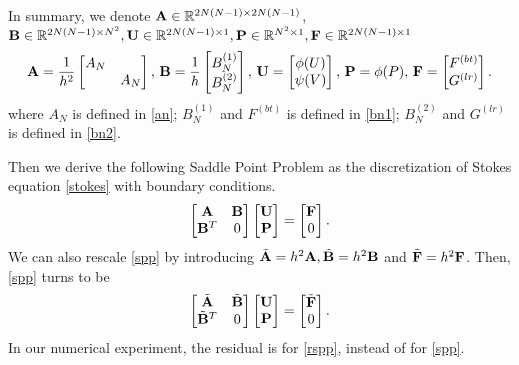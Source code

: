 \documentclass[english]{pkupaper}
\begin{document}
In summary, we denote $\mathbf{A}\in\mathbb{R}^{2N(N-1)\times2N(N-1)}$, $\mathbf{B}\in \mathbb{R}^{2N(N-1)\times N^2}, \mathbf{U} \in\mathbb{R}^{2N(N-1)\times1}, \mathbf{P}\in \mathbb{R}^{N^2\times1}, \mathbf{F} \in\mathbb{R}^{2N(N-1)\times1}$
\begin{equation}
\mathbf{A}=\frac{1}{h^2}\begin{bmatrix}
A_N\\
&A_N
\end{bmatrix},\, \mathbf{B}=\frac{1}{h}\begin{bmatrix}
B^{(1)}_N\\
B^{(2)}_N
\end{bmatrix},\,\mathbf{U}=\begin{bmatrix}
\phi(U)\\
\psi(V)
\end{bmatrix},\, \mathbf{P}=
\phi(P),\, \mathbf{F}=\begin{bmatrix}
F^{(bt)}\\
G^{(lr)}
\end{bmatrix}.
\end{equation}
where $A_N$ is defined in \ref{an}; $B_N^{(1)}$ and  $F^{(bt)}$ is defined in \ref{bn1}; $B_N^{(2)}$ and $G^{(lr)}$ is defined in \ref{bn2}.

Then we derive the following Saddle Point Problem as the discretization of Stokes equation \ref{stokes} with boundary conditions.
\begin{equation}
\label{spp}
\begin{bmatrix}
\mathbf{A}&\mathbf{B}\\\mathbf{B}^T&0
\end{bmatrix}\begin{bmatrix}
\mathbf{U}\\\mathbf{P}
\end{bmatrix}=\begin{bmatrix}
\mathbf{F}\\0
\end{bmatrix}.
\end{equation}
We can also rescale \ref{spp} by introducing $\tilde {\mathbf{A}} = h^2\mathbf{A}, \tilde {\mathbf{B}} = h^2\mathbf{B}$ and $\tilde {\mathbf{F}}=h^2\mathbf{F}$. Then, \ref{spp} turns to be 
\begin{equation}
\label{rspp}
\begin{bmatrix}
\tilde{\mathbf{A}}&\tilde{\mathbf{B}}\\\tilde{\mathbf{B}}^T&0
\end{bmatrix}\begin{bmatrix}
\mathbf{U}\\\mathbf{P}
\end{bmatrix}=\begin{bmatrix}
\tilde{\mathbf{F}}\\0
\end{bmatrix}.
\end{equation}
In our numerical experiment, the residual is for \ref{rspp}, instead of for \ref{spp}. 
\end{document}

